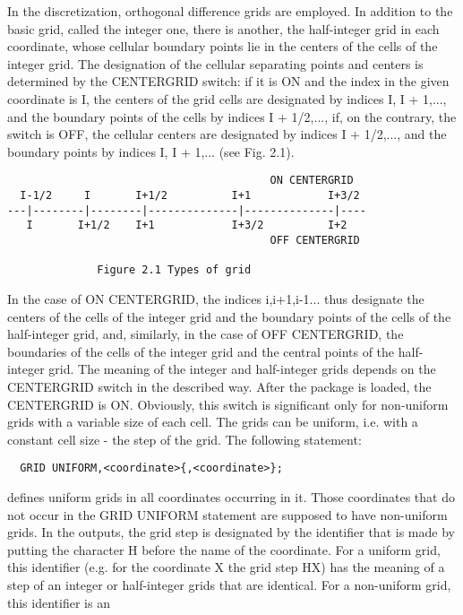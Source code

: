      In the discretization, orthogonal  difference  grids  are employed.
In addition to the basic grid, called the integer one, there is another,
the half-integer grid in each coordinate, whose cellular boundary points
lie in  the centers of the cells of the integer grid. The designation of
the  cellular  separating  points  and  centers  is  determined  by  the
CENTERGRID switch:  if it is ON and the index in the given coordinate is
I, the centers of the grid cells are designated by indices I, I + 1,...,
and the  boundary points of the cells by indices I + 1/2,..., if, on the
contrary, the switch is OFF,  the  cellular  centers  are  designated by
indices I  + 1/2,...,  and the  boundary points  by indices I, I + 1,...
(see Fig. 2.1).
\begin{verbatim}
                                         ON CENTERGRID
  I-1/2     I       I+1/2          I+1            I+3/2
---|--------|--------|--------------|--------------|----
   I       I+1/2    I+1            I+3/2          I+2
                                         OFF CENTERGRID

              Figure 2.1 Types of grid
\end{verbatim}
In the case of  ON CENTERGRID,  the indices  i,i+1,i-1... thus designate
the centers  of the cells of the integer grid and the boundary points of
the cells of the half-integer grid, and, similarly,  in the  case of OFF
CENTERGRID,  the  boundaries  of  the  cells of the integer grid and the
central points of the half-integer grid. The meaning of the  integer and
half-integer  grids  depends  on  the CENTERGRID switch in the described
way. After the package is loaded, the CENTERGRID is ON.  Obviously, this
switch is significant only for non-uniform grids with a variable size of
each cell.
     The grids can be uniform, i.e. with a constant cell size - the step
of the grid. The following statement:
\begin{verbatim}
  GRID UNIFORM,<coordinate>{,<coordinate>};
\end{verbatim}
defines  uniform  grids  in  all  coordinates  occurring  in  it.  Those
coordinates that do not occur in the GRID UNIFORM statement are supposed
to have non-uniform grids.
     In the  outputs, the grid step is designated by the identifier that
is made by putting the character  H before  the name  of the coordinate.
For a  uniform grid, this identifier (e.g. for the coordinate X the grid
step HX) has the meaning of a step of an  integer or  half-integer grids
that  are  identical.  For  a  non-uniform  grid,  this identifier is an
